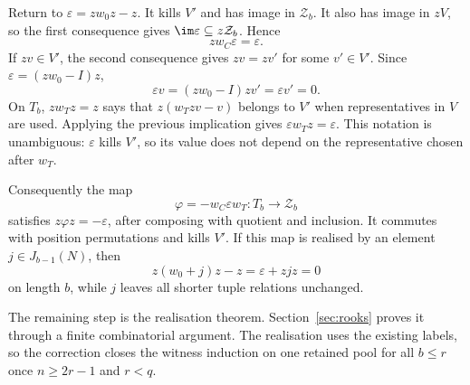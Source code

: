 Return to $\varepsilon=zw_0z-z$. It kills $V'$ and has image in $\mathcal Z_b$. It also has image in $zV$, so the first consequence gives $\im\varepsilon\subseteq z\mathcal Z_b$. Hence
\[zw_C\varepsilon=\varepsilon.
\]
If $zv\in V'$, the second consequence gives $zv=zv'$ for some $v'\in V'$. Since $\varepsilon=(zw_0-I)z$,
\[\varepsilon v=(zw_0-I)zv' =\varepsilon v'=0.
\]
On $T_b$, $zw_Tz=z$ says that $z(w_Tzv-v)$ belongs to $V'$ when representatives in $V$ are used. Applying the previous implication gives $\varepsilon w_Tz=\varepsilon$. This notation is unambiguous: $\varepsilon$ kills $V'$, so its value does not depend on the representative chosen after $w_T$.

Consequently the map
\[\varphi=-w_C\varepsilon w_T:T_b\longrightarrow \mathcal Z_b
\]
satisfies $z\varphi z=-\varepsilon$, after composing with quotient and inclusion. It commutes with position permutations and kills $V'$. If this map is realised by an element $j\in J_{b-1}(N)$, then
\[z(w_0+j)z-z=\varepsilon+zjz=0
\]
on length $b$, while $j$ leaves all shorter tuple relations unchanged.

The remaining step is the realisation theorem. Section~\ref{sec:rooks} proves it through a finite combinatorial argument. The realisation uses the existing labels, so the correction closes the witness induction on one retained pool for all $b\le r$ once $n\ge2r-1$ and $r<q$.
